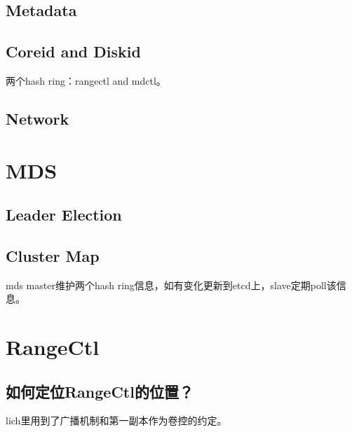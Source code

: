 
\subsection{Metadata}


\subsection{Coreid and Diskid}


两个hash ring：rangectl and mdctl。

\subsection{Network}


\section{MDS}

\subsection{Leader Election}

\subsection{Cluster Map}



mds master维护两个hash ring信息，如有变化更新到etcd上，slave定期poll该信息。

\section{RangeCtl}

\subsection{如何定位RangeCtl的位置？}

lich里用到了广播机制和第一副本作为卷控的约定。

